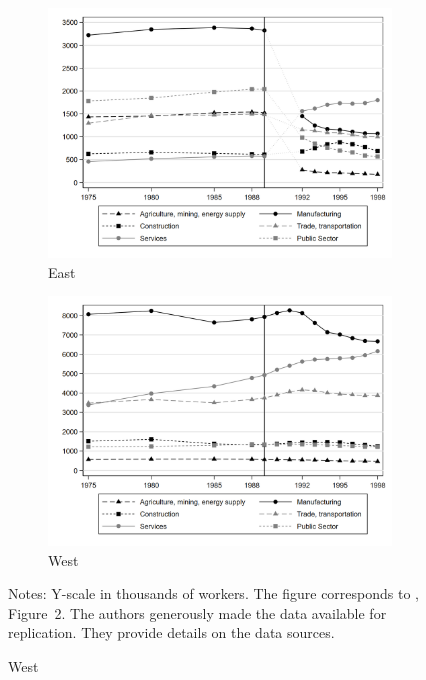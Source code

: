 \begin{Article}
\begin{refsection}[Spitz]
\begin{figure}
\caption{\textbf Sectoral Employment in East and West Germany, 1975--1998}\label{fig1}
     \centering
     \begin{subfigure}[b]{0.8\textwidth}
         \centering
         \includegraphics[width=\textwidth]{emp_East.png}
         \caption{East}
         \label{Fig1a}
     \end{subfigure}
     \hfill
     \begin{subfigure}[b]{0.8\textwidth}
         \centering
         \includegraphics[width=\textwidth]{emp_West.png}
         \caption{West}
         \label{Fig1b}
     \end{subfigure}
     {\footnotesize
    \hspace*{0.1cm}\parbox[h]{\linewidth}{Notes: Y-scale in thousands of workers. The figure corresponds to \cite{FindeisenLeePorzioDauth2021}, Figure~2. The authors generously made the data available for replication. They provide details on the data sources.}}
\end{figure}


\end{refsection}
\end{Article}
